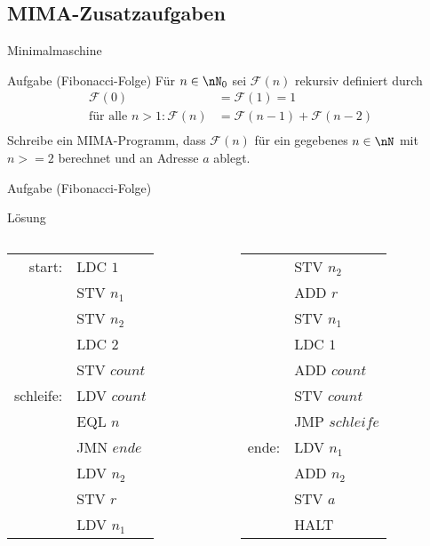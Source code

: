 \subsection{MIMA-Zusatzaufgaben}

\begin{frame}{Minimalmaschine}
	\begin{exampleblock}{Aufgabe (Fibonacci-Folge)}
		Für $n \in \nN_0$ sei $\mathcal{F}(n)$ rekursiv definiert durch\\
		\begin{align*}
			 \mathcal{F}(0) &=  \mathcal{F}(1) = 1\\
			\text{für alle }n>1: \mathcal{F}(n) &= \mathcal{F}(n-1) + \mathcal{F}(n-2)\\
		\end{align*}
		Schreibe ein MIMA-Programm, dass $\mathcal{F}(n)$ für ein gegebenes $n \in \nN$ mit $n>=2$ berechnet und an Adresse $a$ ablegt.
	\end{exampleblock}
\end{frame}
	
\begin{frame}{Aufgabe (Fibonacci-Folge)}
	\begin{block}{Lösung}

	\begin{columns}
		\begin{column}{0.4\textwidth}
		\begin{tabular}{rl}
			start: & LDC $1$\\
			& STV $n_1$\\
			& STV $n_2$\\
			& LDC $2$\\
			& STV $count$\\
			schleife: & LDV $count$\\
			& EQL $n$\\
			& JMN $ende$\\
			& LDV $n_2$\\
			& STV $r$\\
			& LDV $n_1$\\			
		\end{tabular}
		\end{column}

		\begin{column}{0.4\textwidth}
		\begin{tabular}{rl}
			& STV $n_2$\\
			& ADD $r$\\
			& STV $n_1$\\
			& LDC $1$\\
			& ADD $count$\\
			& STV $count$\\
			& JMP $schleife$\\
			ende: & LDV $n_1$\\
			& ADD $n_2$\\
			& STV $a$\\
			& HALT			
		\end{tabular}
		\end{column}
	\end{columns}	
	\end{block}
\end{frame}